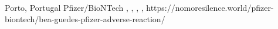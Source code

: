           {
            Porto, Portugal
          }
          {
          }
          {
            Pfizer/BioNTech
          }
          {
          }
          {
            ,
            ,
            ,
            ,
          }
          {
            https://nomoresilence.world/pfizer-biontech/bea-guedes-pfizer-adverse-reaction/
          }

